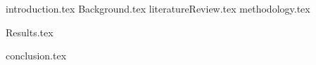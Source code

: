 \documentclass[a4paper,12pt,oneside,openbib,oldfontcommands]{memoir} %
\newcommand{\clearemptydoublepage}{\newpage{\thispagestyle{empty}\cleardoublepage}}
\renewcommand{\bibname}{References}
\theoremstyle{plain}
\theoremstyle{plain}
\theoremstyle{plain}
\theoremstyle{definition}
\theoremstyle{plain}
\theoremstyle{plain}
\theoremstyle{plain}
\begin{document}
% 
%
% 
\frontmatter
{}
%

%

%

%
%
\listoftables
{}
\newpage
%
%
\listoffigures
{}
\newpage
%
%
\renewcommand{\contentsname}{Table of Contents}
\tableofcontents*
%


\mainmatter
%
{introduction.tex}
%
{Background.tex}
%
{literatureReview.tex}
%
{methodology.tex}

{Results.tex}

{conclusion.tex}

%

\backmatter
\cleardoublepage
{}
\renewcommand{\bibname}{References}     


\clearemptydoublepage
%
%   
\end{document}
